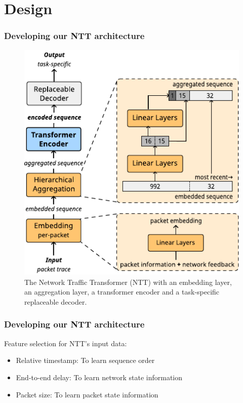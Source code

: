 \documentclass{beamer}
\begin{document}

\section{Design}


\begin{frame}
\frametitle{Developing our NTT architecture}
\pause

\begin{figure}[!hbt]
  \begin{center}
    \includegraphics[scale=0.8]{figures/architecture_ntt.pdf}
    \caption{The Network Traffic Transformer (NTT) with
        an embedding layer, %
        an aggregation layer,  a transformer encoder
        and a task-specific replaceable decoder.}
    \label{fig:ntt}
  \end{center}
\end{figure}
\end{frame}

\begin{frame}
\frametitle{Developing our NTT architecture}

Feature selection for NTT's input data:
\pause 
\begin{itemize}
    \item<1-> \alert{Relative timestamp:} To learn sequence order
    \item<1-> \alert{End-to-end delay:} To learn network state information
    \item<1-> \alert{Packet size:} To learn packet state information
\end{itemize}

\end{frame}
\end{document}
